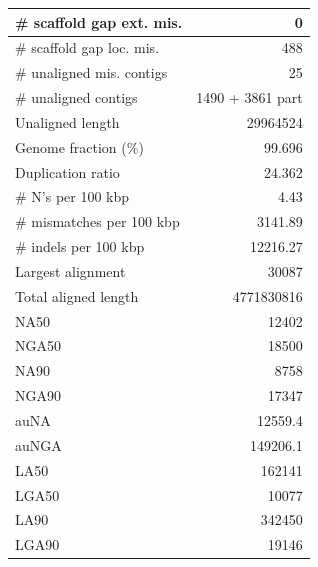 \documentclass[12pt,a4paper]{article}
\begin{document}
\begin{table}[ht]
\begin{center}
\begin{tabular}{|l*{1}{|r}|}
\# scaffold gap ext. mis. & 0 \\ \hline
\# scaffold gap loc. mis. & 488 \\ \hline
\# unaligned mis. contigs & 25 \\ \hline
\# unaligned contigs & 1490 + 3861 part \\ \hline
Unaligned length & 29964524 \\ \hline
Genome fraction (\%) & 99.696 \\ \hline
Duplication ratio & 24.362 \\ \hline
\# N's per 100 kbp & 4.43 \\ \hline
\# mismatches per 100 kbp & 3141.89 \\ \hline
\# indels per 100 kbp & 12216.27 \\ \hline
Largest alignment & 30087 \\ \hline
Total aligned length & 4771830816 \\ \hline
NA50 & 12402 \\ \hline
NGA50 & 18500 \\ \hline
NA90 & 8758 \\ \hline
NGA90 & 17347 \\ \hline
auNA & 12559.4 \\ \hline
auNGA & 149206.1 \\ \hline
LA50 & 162141 \\ \hline
LGA50 & 10077 \\ \hline
LA90 & 342450 \\ \hline
LGA90 & 19146 \\ \hline
\end{tabular}
\end{center}
\end{table}
\end{document}
